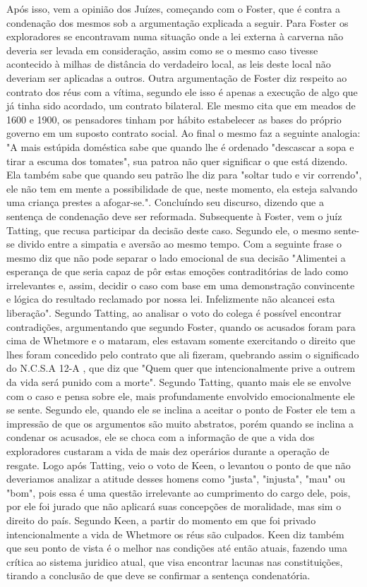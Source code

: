 \documentclass[12pt]{article}
\begin{document}
Após isso, vem a opinião dos Juízes, começando com o Foster, que é contra a condenação dos mesmos sob a argumentação explicada a seguir. Para Foster os exploradores se encontravam numa situação onde a lei externa à carverna não deveria ser levada em consideração, assim como se o mesmo caso tivesse acontecido à milhas de distância do verdadeiro local, as leis deste local não deveriam ser aplicadas a outros. Outra argumentação de Foster diz respeito ao contrato dos réus com a vítima, segundo ele isso é apenas a execução de algo que já tinha sido acordado, um contrato bilateral. Ele mesmo cita que em meados de 1600 e 1900, os pensadores tinham por hábito estabelecer as bases do próprio governo em um suposto contrato social. Ao final o mesmo faz a seguinte analogia: "A mais estúpida doméstica sabe que quando lhe é ordenado "descascar a sopa e tirar a escuma dos tomates", sua patroa não quer significar o que está dizendo. Ela também sabe que quando seu patrão lhe diz para "soltar tudo e vir correndo", ele não tem em mente a possibilidade de que, neste momento, ela esteja salvando uma criança prestes a afogar-se.". Concluíndo seu discurso, dizendo que a sentença de condenação deve ser reformada.
Subsequente à Foster, vem o juíz Tatting, que recusa participar da decisão deste caso. Segundo ele, o mesmo sente-se divido entre a simpatia e aversão ao mesmo tempo. Com a seguinte frase o mesmo diz que não pode separar o lado emocional de sua decisão "Alimentei a esperança de que seria capaz de pôr estas emoções contraditórias de lado como irrelevantes e, assim, decidir o caso com base em uma demonstração convincente e lógica do resultado reclamado por nossa lei. Infelizmente não alcancei esta liberação". Segundo Tatting, ao analisar o voto do colega é possível encontrar contradições, argumentando que segundo Foster, quando os acusados foram para cima de Whetmore e o mataram, eles estavam somente exercitando o direito que lhes foram concedido pelo contrato que ali fizeram, quebrando assim o significado do N.C.S.A 12-A , que diz que "Quem quer que intencionalmente prive a outrem da vida será punido com a morte". Segundo Tatting, quanto mais ele se envolve com o caso e pensa sobre ele, mais profundamente envolvido emocionalmente ele se sente. Segundo ele, quando ele se inclina a aceitar o ponto de Foster ele tem a impressão de que os argumentos são muito abstratos, porém quando se inclina a condenar os acusados, ele se choca com a informação de que a vida dos exploradores custaram a vida de mais dez operários durante a operação de resgate.
Logo após Tatting, veio o voto de Keen, o levantou o ponto de que não deveriamos analizar a atitude desses homens como "justa", "injusta", "mau" ou "bom", pois essa é uma questão irrelevante ao cumprimento do cargo dele, pois, por ele foi jurado que não aplicará suas concepções de moralidade, mas sim o direito do país. Segundo Keen, a partir do momento em que foi privado intencionalmente a vida de Whetmore os réus são culpados. Keen diz também que seu ponto de vista é o melhor nas condições até então atuais, fazendo uma crítica ao sistema juridico atual, que visa encontrar lacunas nas constituições, tirando a conclusão de que deve se confirmar a sentença condenatória.
\end{document}
